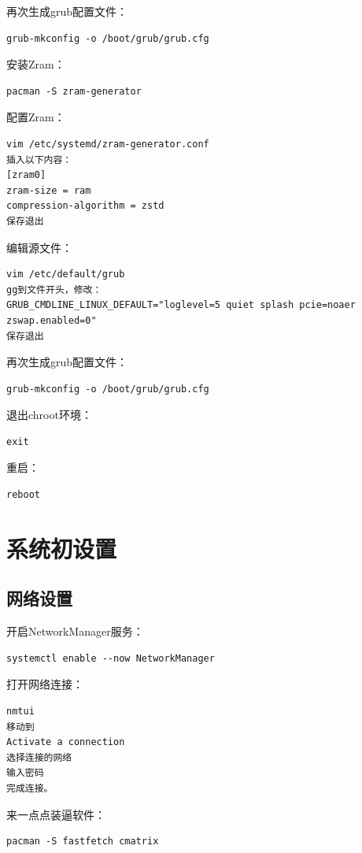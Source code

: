 \documentclass[a4paper, twocolumn, twoside, 10pt]{article}
\begin{document}
再次生成grub配置文件：
\begin{lstlisting}
grub-mkconfig -o /boot/grub/grub.cfg
\end{lstlisting}

安装Zram：
\begin{lstlisting}
pacman -S zram-generator
\end{lstlisting}

配置Zram：
\begin{lstlisting}
vim /etc/systemd/zram-generator.conf
插入以下内容：
[zram0]
zram-size = ram
compression-algorithm = zstd
保存退出
\end{lstlisting}

编辑源文件：
\begin{lstlisting}
vim /etc/default/grub
gg到文件开头，修改：
GRUB_CMDLINE_LINUX_DEFAULT="loglevel=5 quiet splash pcie=noaer zswap.enabled=0"
保存退出
\end{lstlisting}

再次生成grub配置文件：
\begin{lstlisting}
grub-mkconfig -o /boot/grub/grub.cfg
\end{lstlisting}

退出chroot环境：
\begin{lstlisting}
exit
\end{lstlisting}

重启：
\begin{lstlisting}
reboot
\end{lstlisting}

\section{系统初设置}

\subsection{网络设置}

开启NetworkManager服务：
\begin{lstlisting}
systemctl enable --now NetworkManager
\end{lstlisting}

打开网络连接：
\begin{lstlisting}
nmtui
移动到
Activate a connection
选择连接的网络
输入密码
完成连接。
\end{lstlisting}

来一点点装逼软件：
\begin{lstlisting}
pacman -S fastfetch cmatrix
\end{lstlisting}
\end{document}
